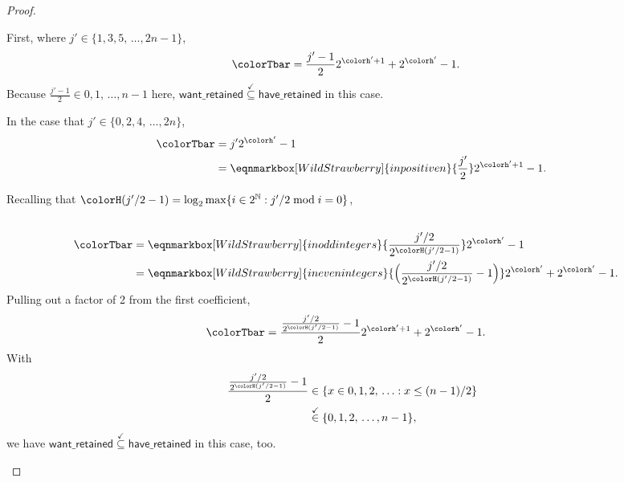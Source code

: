 \begin{proof}
\begin{proofpart}
First, where $j' \in \{1,3,5,\,\ldots,2n-1\}$,
\begin{align*}
\colorTbar
&= \frac{j'-1}{2} 2^{\colorh' + 1} + 2^{\colorh'} - 1.
\end{align*}
Because $\frac{j'-1}{2} \in 0, 1, \, \ldots, n - 1$ here, $\mathsf{want\_retained} \stackrel{\checkmark}{\subseteq} \mathsf{have\_retained}$ in this case.

In the case that $j' \in \{0,2,4,\,\ldots,2n\}$,
\begin{align*}
\colorTbar
&= j'2^{\colorh'} - 1\\
&=
\eqnmarkbox[WildStrawberry]{inpositiven}{
  \frac{j'}{2}
}2^{\colorh' + 1} - 1.
\end{align*}

Recalling that $\colorH(j'/2 - 1) = \log_2 \max\{ i \in 2^{\mathbb{N}} : j'/2 \bmod i = 0 \}$,
\begin{align*}
\\
\colorTbar
&=
\eqnmarkbox[WildStrawberry]{inoddintegers}{
  \frac{j'/2}{2^{\colorH(j'/2 - 1)}}
}
2^{\colorh'} - 1\\
&=
\eqnmarkbox[WildStrawberry]{inevenintegers}{
  \Big(\frac{j'/2}{2^{\colorH(j'/2 - 1)}} - 1\Big)
}
2^{\colorh'} + 2^{\colorh'} - 1.\\
\end{align*}
Pulling out a factor of 2 from the first coefficient,
\begin{align*}
  \colorTbar
  &=
  \frac{
    \frac{j'/2}{2^{\colorH(j'/2 - 1)}} - 1
  }{2}
2^{\colorh' + 1} + 2^{\colorh'} - 1.
\end{align*}
With
\begin{align*}
  \frac{
    \frac{j'/2}{2^{\colorH(j'/2 - 1)}} - 1
  }{2}
  &\in \{x \in 0,1,2,\,\ldots: x \leq (n-1)/2\}\\
  &\stackrel{\checkmark}{\in} \{0,1,2,\,\ldots,n-1\},
\end{align*}
we have $\mathsf{want\_retained} \stackrel{\checkmark}{\subseteq} \mathsf{have\_retained}$ in this case, too.
\end{proofpart}
\end{proof}
